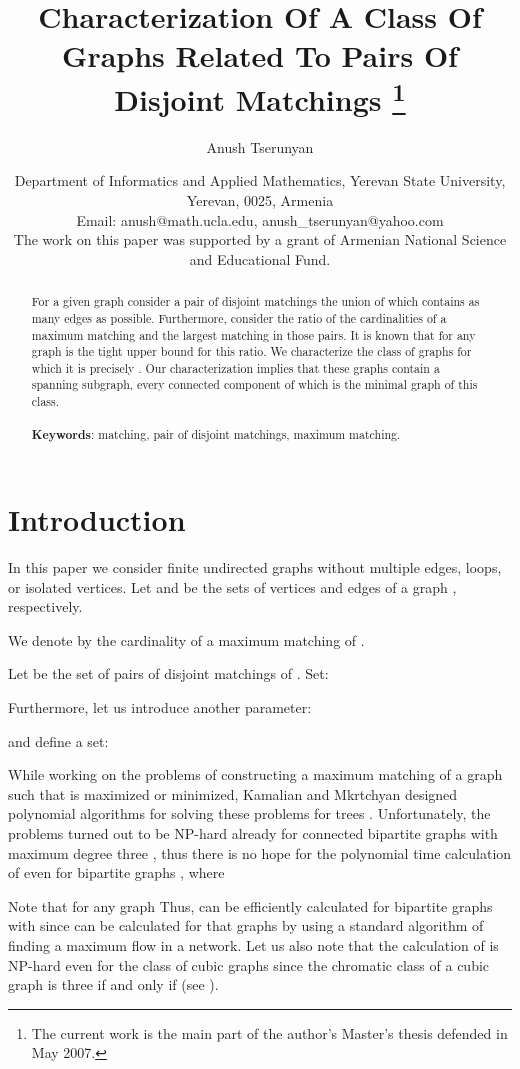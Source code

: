 \documentclass[a4paper, 12pt]{article}
\title{Characterization Of A Class Of Graphs Related To Pairs Of Disjoint Matchings \thanks{The current work is the main part of the author's Master's thesis defended in May 2007.}}
\author{Anush Tserunyan}
\date{\small{Department of Informatics and Applied Mathematics, Yerevan State
University, \\ Yerevan, 0025, Armenia \\ Email: anush@math.ucla.edu,
anush\_tserunyan@yahoo.com \\} \scriptsize{The work on this paper
was supported by a grant of Armenian National Science and
Educational Fund.}}
\newenvironment{dedication}[1][]{\begin{trivlist}
\item[\hskip \labelsep {\bfseries #1}]}{\end{trivlist}}
\begin{document}
\maketitle

\begin{dedication}

\end{dedication}

\begin{abstract}
For a given graph consider a pair of disjoint matchings the union of
which contains as many edges as possible. Furthermore, consider the
ratio of the cardinalities of a maximum matching and the largest
matching in those pairs. It is known that for any graph
 is the tight upper bound for this ratio. We
characterize the class of graphs for which it is precisely
. Our characterization implies that these graphs
contain a spanning subgraph, every connected component of which is
the minimal graph of this class.
\\ \\ {\bf Keywords}: matching, pair of disjoint matchings, maximum
matching.
\end{abstract}

\section{Introduction}
In this paper we consider finite undirected graphs without multiple
edges, loops, or isolated vertices. Let  and  be the
sets of vertices and edges of a graph , respectively.

We denote by  the cardinality of a maximum matching of
.

Let  be the set of pairs of disjoint matchings of . Set:


Furthermore, let us introduce another parameter:

and define a set:


While working on the problems of constructing a maximum matching 
of a graph  such that  is maximized or
minimized, Kamalian and Mkrtchyan designed polynomial algorithms for
solving these problems for trees \cite{alg}. Unfortunately, the
problems turned out to be NP-hard already for connected bipartite
graphs with maximum degree three \cite{np}, thus there is no hope
for the polynomial time calculation of  even for
bipartite graphs , where 

Note that for any graph   Thus, 
can be efficiently calculated for bipartite graphs  with
 since  can be calculated for that
graphs by using a standard algorithm of finding a maximum flow in a
network. Let us also note that the calculation of  is
NP-hard even for the class of cubic graphs since the chromatic class
of a cubic graph  is three if and only if 
(see \cite{Holyer}).
\end{document}
